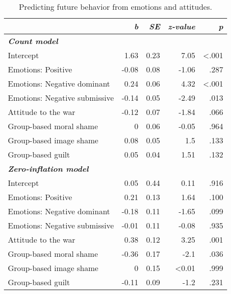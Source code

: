 \documentclass[
]{article}
\begin{document}
\begin{table}[H]

\caption{\label{tab:TableS4}Predicting future behavior from emotions and attitudes.}
\centering
\fontsize{8}{10}\selectfont
\begin{tabular}[t]{lrrrr}
\toprule
\em{ } & \em{b} & \em{SE} & \em{z-value} & \em{p}\\
\midrule
\em{\textbf{Count model}} & \em{\textbf{}} & \em{\textbf{}} & \em{\textbf{}} & \em{\textbf{}}\\
\midrule
Intercept & 1.63 & 0.23 & 7.05 & <.001\\
Emotions: Positive & -0.08 & 0.08 & -1.06 & .287\\
Emotions: Negative dominant & 0.24 & 0.06 & 4.32 & <.001\\
Emotions: Negative submissive & -0.14 & 0.05 & -2.49 & .013\\
\addlinespace
Attitude to the war & -0.12 & 0.07 & -1.84 & .066\\
Group-based moral shame & 0 & 0.06 & -0.05 & .964\\
Group-based image shame & 0.08 & 0.05 & 1.5 & .133\\
Group-based guilt & 0.05 & 0.04 & 1.51 & .132\\
\midrule
\em{\textbf{Zero-inflation model}} & \em{\textbf{}} & \em{\textbf{}} & \em{\textbf{}} & \em{\textbf{}}\\
\midrule
\addlinespace
Intercept & 0.05 & 0.44 & 0.11 & .916\\
Emotions: Positive & 0.21 & 0.13 & 1.64 & .100\\
Emotions: Negative dominant & -0.18 & 0.11 & -1.65 & .099\\
Emotions: Negative submissive & -0.01 & 0.11 & -0.08 & .935\\
Attitude to the war & 0.38 & 0.12 & 3.25 & .001\\
\addlinespace
Group-based moral shame & -0.36 & 0.17 & -2.1 & .036\\
Group-based image shame & 0 & 0.15 & <0.01 & .999\\
Group-based guilt & -0.11 & 0.09 & -1.2 & .231\\
\bottomrule
\end{tabular}
\end{table}
\end{document}

